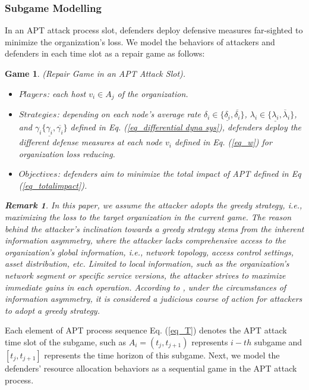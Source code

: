 \documentclass[lettersize,journal]{IEEEtran}
\newtheorem{remark}{ \textbf{Remark}}
\newtheorem{game}{ \textbf{Game}}
\begin{document}
\subsubsection{Subgame Modelling}
In an APT attack process slot, defenders deploy defensive measures far-sighted to minimize the organization's loss. We model the behaviors of attackers and defenders in each time slot as a repair game as follows:
\begin{game}\label{game1}
(Repair Game in an APT Attack Slot).
\begin{itemize}
      \item $Players$: each host $v_i \in A_j$ of the organization.
      \item $Strategies$: depending on each node's average rate $\delta_i \in \{\underline{\delta_{i}}, \overline{{\delta}_{i}}\}$, $\lambda_i \in \{\underline{\lambda_{i}}, \overline{\lambda}_{i}\}$, and $\gamma_i \{\underline{\gamma_{i}}, \overline{\gamma_{i}}\}$ defined in Eq. (\ref{eq_differential dyna sys}), defenders deploy the different defense measures at each node $v_i$ defined in Eq. (\ref{eq_w}) for organization loss reducing.
      \item $Objectives$: defenders aim to minimize the total impact of APT defined in Eq (\ref{eq_totalimpact}).
\end{itemize}
\begin{remark}
\label{r5}
In this paper, we assume the attacker adopts the greedy strategy, i.e., maximizing the loss to the target organization in the current game. The reason behind the attacker's inclination towards a greedy strategy stems from the inherent information asymmetry, where the attacker lacks comprehensive access to the organization's global information, i.e., network topology, access control settings, asset distribution, etc. Limited to local information, such as the organization's network segment or specific service versions, the attacker strives to maximize immediate gains in each operation. According to \cite{ye2020differentially}, under the circumstances of information asymmetry, it is considered a judicious course of action for attackers to adopt a greedy strategy.
\end{remark}
\end{game}
\par
 Each element of APT process sequence Eq. (\ref{eq_T}) denotes the APT attack time slot of the subgame, such as $A_i=(t_j,t_{j+1})$ represents $i-th$ subgame and $[t_j,t_{j+1}]$ represents the time horizon of this subgame. Next, we model the defenders’ resource allocation behaviors as a sequential game in the APT attack process.
\end{document}
